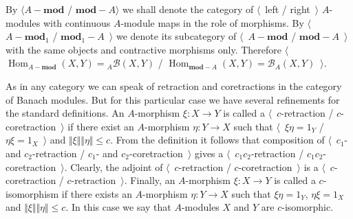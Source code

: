 By $\langle A-\mathbf{mod}$ / $\mathbf{mod}-A\rangle$ we shall denote the
category of $\langle$~left / right~$\rangle$ $A$-modules with continuous
$A$-module maps in the role of morphisms. By $\langle$~$A-\mathbf{mod}_1$ /
$\mathbf{mod}_1-A$~$\rangle$ we denote its subcategory of
$\langle$~$A-\mathbf{mod}$ / $\mathbf{mod}-A$~$\rangle$ with the same objects
and contractive morphisms only. Therefore 
$\langle$~$\operatorname{Hom}_{A-\mathbf{mod}}(X,Y)={}_A\mathcal{B}(X,Y)$ /
$\operatorname{Hom}_{\mathbf{mod}-A}(X,Y)=\mathcal{B}_A(X,Y)$~$\rangle$. 

As in any category we can speak of retraction and     coretractions in the
category of Banach modules. But for this particular case we have several
refinements for the standard definitions. An $A$-morphism $\xi:X\to Y$ is called
a $\langle$~$c$-retraction / $c$-coretraction~$\rangle$ if there exist an
$A$-morphism $\eta:Y\to X$ such that $\langle$~$\xi\eta=1_Y$ /
$\eta\xi=1_X$~$\rangle$ and $\Vert\xi\Vert\Vert\eta\Vert\leq c$. From the
definition it follows that composition of $\langle$~$c_1$- and $c_2$-retraction
/ $c_1$- and $c_2$-coretraction~$\rangle$ gives a $\langle$~$c_1c_2$-retraction
/ $c_1c_2$-coretraction~$\rangle$. Clearly, the adjoint of
$\langle$~$c$-retraction / $c$-coretraction~$\rangle$ is a
$\langle$~$c$-coretraction / $c$-retraction~$\rangle$. Finally, an $A$-morphism
$\xi:X\to Y$ is called a $c$-isomorphism if there exists an $A$-morphism
$\eta:Y\to X$ such that $\xi\eta=1_Y$, $\eta\xi=1_X$ and
$\Vert\xi\Vert\Vert\eta\Vert\leq c$. In this case we say that $A$-modules $X$
and $Y$ are $c$-isomorphic.


